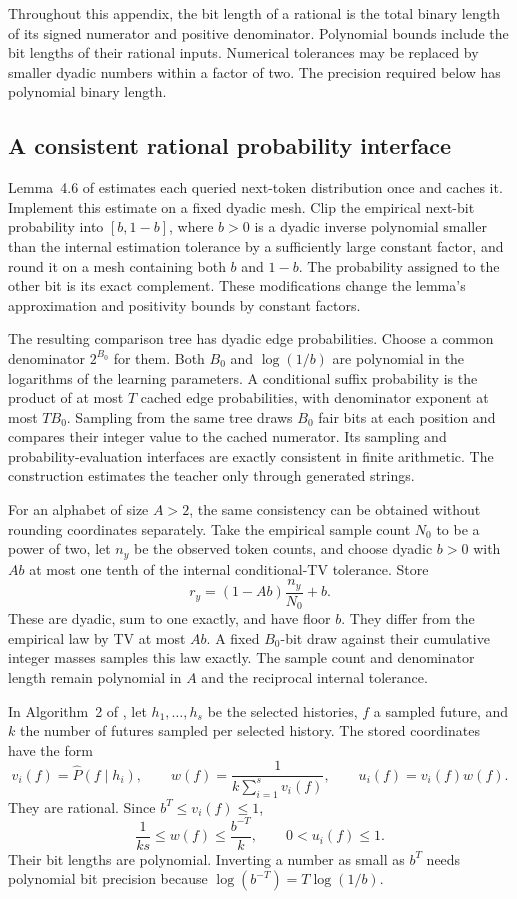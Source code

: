 \documentclass[11pt]{article}
\theoremstyle{definition}
\theoremstyle{remark}
\begin{document}
Throughout this appendix, the bit length of a rational is the total binary length of its signed numerator and positive denominator. Polynomial bounds include the bit lengths of their rational inputs. Numerical tolerances may be replaced by smaller dyadic numbers within a factor of two. The precision required below has polynomial binary length.

\subsection{A consistent rational probability interface}

Lemma~4.6 of \citet{liu-moitra} estimates each queried next-token distribution once and caches it. Implement this estimate on a fixed dyadic mesh. Clip the empirical next-bit probability into $[b,1-b]$, where $b>0$ is a dyadic inverse polynomial smaller than the internal estimation tolerance by a sufficiently large constant factor, and round it on a mesh containing both $b$ and $1-b$. The probability assigned to the other bit is its exact complement. These modifications change the lemma's approximation and positivity bounds by constant factors.

The resulting comparison tree has dyadic edge probabilities. Choose a common denominator $2^{B_0}$ for them. Both $B_0$ and $\log(1/b)$ are polynomial in the logarithms of the learning parameters. A conditional suffix probability is the product of at most $T$ cached edge probabilities, with denominator exponent at most $TB_0$. Sampling from the same tree draws $B_0$ fair bits at each position and compares their integer value to the cached numerator. Its sampling and probability-evaluation interfaces are exactly consistent in finite arithmetic. The construction estimates the teacher only through generated strings.

For an alphabet of size $A>2$, the same consistency can be obtained without rounding coordinates separately. Take the empirical sample count $N_0$ to be a power of two, let $n_y$ be the observed token counts, and choose dyadic $b>0$ with $Ab$ at most one tenth of the internal conditional-TV tolerance. Store
\[
r_y=(1-Ab)\frac{n_y}{N_0}+b.
\]
These are dyadic, sum to one exactly, and have floor $b$. They differ from the empirical law by TV at most $Ab$. A fixed $B_0$-bit draw against their cumulative integer masses samples this law exactly. The sample count and denominator length remain polynomial in $A$ and the reciprocal internal tolerance.

In Algorithm~2 of \citet{liu-moitra}, let $h_1,\ldots,h_s$ be the selected histories, $f$ a sampled future, and $k$ the number of futures sampled per selected history. The stored coordinates have the form
\[
v_i(f)=\widehat P(f\mid h_i),\qquad
w(f)=\frac1{k\sum_{i=1}^s v_i(f)},\qquad
u_i(f)=v_i(f)w(f).
\]
They are rational. Since $b^T\le v_i(f)\le1$,
\[
\frac1{ks}\le w(f)\le\frac{b^{-T}}k,\qquad 0<u_i(f)\le1.
\]
Their bit lengths are polynomial. Inverting a number as small as $b^T$ needs polynomial bit precision because $\log(b^{-T})=T\log(1/b)$.
\end{document}
